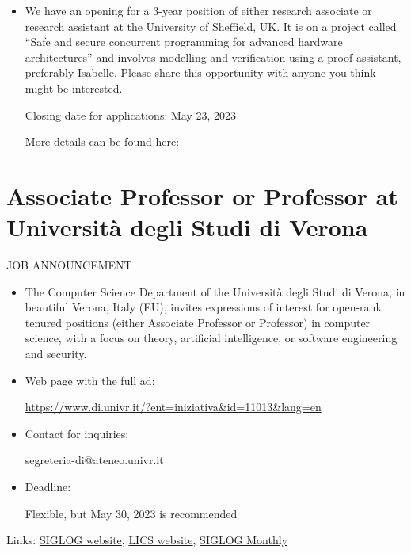 \documentclass[prodmode,acmtecs]{acmsmall} %
\begin{document}
\begin{itemize}\item  We have an opening for a 3-year position of either research associate or research assistant at the University of Sheffield, UK. It is on a project called ``Safe and secure concurrent programming for advanced hardware architectures'' and involves modelling and verification using a proof assistant, preferably Isabelle. Please share this opportunity with anyone you think might be interested.  
 
Closing date for applications: May 23, 2023 
 
  More details can be found here: 
 
\end{itemize}\section{Associate Professor or Professor at Università degli Studi di Verona}\label{AssociateProfessororProfessoratUniversitdegliStudidiVerona}JOB ANNOUNCEMENT 

\begin{itemize}\item  The Computer Science Department of the Università degli Studi di Verona, in beautiful Verona, Italy (EU), invites expressions of interest for open-rank tenured positions (either Associate Professor or Professor) in computer science, with a focus on theory, artificial intelligence, or software engineering and security. 
 
\item  Web page with the full ad: 
 
  \href{https://www.di.univr.it/?ent=iniziativa\&id=11013\&lang=en}{https://www.di.univr.it/?ent=iniziativa\&id=11013\&lang=en} 
 
\item  Contact for inquiries: 
 
  segreteria-di@ateneo.univr.it 
 
\item  Deadline:  
 
  Flexible, but May 30, 2023 is recommended  
 
\end{itemize}


\bigskip Links: \href{http://siglog.org/}{SIGLOG website}, \href{https://lics.siglog.org}{LICS website}, \href{https://lics.siglog.org/newsletters/}{SIGLOG Monthly}
\end{document}

